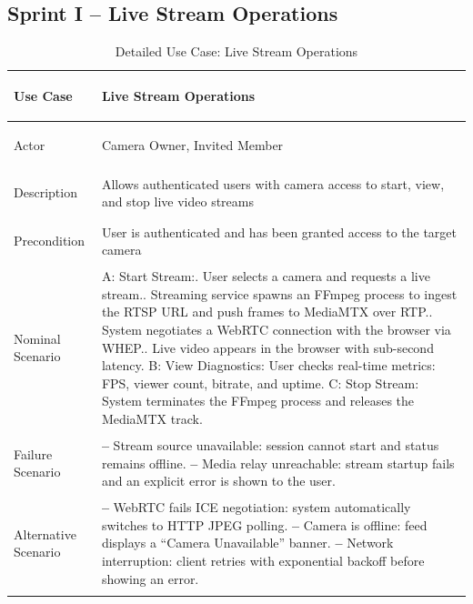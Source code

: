 \documentclass[12pt,a4paper,oneside]{report}
\newlength{\TblTwoKeyW}
\newlength{\TblTwoValW}
\begin{document}
\subsection*{Sprint I -- Live Stream Operations}
{\small
\begin{longtable}{|>{\bfseries\raggedright\arraybackslash}p{\TblTwoKeyW}|>{\raggedright\arraybackslash}p{\TblTwoValW}|}
\hline
Use Case    & Live Stream Operations \\ \hline
Actor       & Camera Owner, Invited Member \\ \hline
Description & Allows authenticated users with camera access to start, view, and stop live video streams \\ \hline
Precondition & User is authenticated and has been granted access to the target camera \\ \hline
Nominal Scenario &
A: Start Stream:\newline
1. User selects a camera and requests a live stream.\newline
2. Streaming service spawns an FFmpeg process to ingest the RTSP URL and push frames to MediaMTX over RTP.\newline
3. System negotiates a WebRTC connection with the browser via WHEP.\newline
4. Live video appears in the browser with sub-second latency.\newline
B: View Diagnostics: User checks real-time metrics: FPS, viewer count, bitrate, and uptime.\newline
C: Stop Stream: System terminates the FFmpeg process and releases the MediaMTX track. \\ \hline
Failure Scenario &
\textbf{--} Stream source unavailable: session cannot start and status remains offline.\newline
\textbf{--} Media relay unreachable: stream startup fails and an explicit error is shown to the user. \\ \hline
Alternative Scenario &
\textbf{--} WebRTC fails ICE negotiation: system automatically switches to HTTP JPEG polling.\newline
\textbf{--} Camera is offline: feed displays a ``Camera Unavailable'' banner.\newline
\textbf{--} Network interruption: client retries with exponential backoff before showing an error. \\ \hline
\caption{Detailed Use Case: Live Stream Operations}
\label{tab:app_uc_streaming}
\end{longtable}
}
\end{document}
